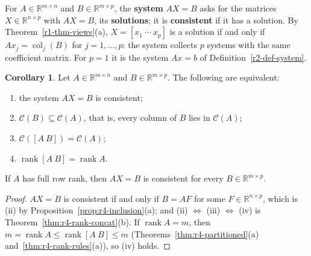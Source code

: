 \documentclass[12pt]{article}
\newcommand{\R}{\mathbb R}
\DeclareMathOperator{\col}{col}
\DeclareMathOperator{\rank}{rank}
\theoremstyle{definition}
\newtheorem{corollary}[theorem]{Corollary}
\begin{document}
For \(A\in\R^{m\times n}\) and \(B\in\R^{m\times p}\), the \textbf{system} \(AX=B\) asks for the matrices
\(X\in\R^{n\times p}\) with \(AX=B\), its \textbf{solutions}; it is \textbf{consistent} if it has a solution. By
Theorem~\ref{r1-thm-views}(a), \(X=[x_1\ \cdots\ x_p]\) is a solution if and only if \(Ax_j=\col_j(B)\) for
\(j=1,\dots,p\): the system collects \(p\) systems with the same coefficient matrix. For \(p=1\) it is the system
\(Ax=b\) of Definition~\ref{r2-def-system}.

\begin{corollary}\label{cor:r4-matrix-system}
Let \(A\in\R^{m\times n}\) and \(B\in\R^{m\times p}\). The following are equivalent:
\begin{enumerate}[label=(\roman*)]
\item the system \(AX=B\) is consistent;
\item \(\mathcal C(B)\subseteq\mathcal C(A)\), that is, every column of \(B\) lies in \(\mathcal C(A)\);
\item \(\mathcal C([A\ B])=\mathcal C(A)\);
\item \(\rank[A\ B]=\rank A\).
\end{enumerate}
If \(A\) has full row rank, then \(AX=B\) is consistent for every \(B\in\R^{m\times p}\).
\end{corollary}
\begin{proof}
\(AX=B\) is consistent if and only if \(B=AF\) for some \(F\in\R^{n\times p}\), which is (ii) by
Proposition~\ref{prop:r4-inclusion}(a); and (ii) \(\Leftrightarrow\) (iii) \(\Leftrightarrow\) (iv) is
Theorem~\ref{thm:r4-rank-concat}(b). If \(\rank A=m\), then
\(m=\rank A\leqslant\rank[A\ B]\leqslant m\) (Theorems~\ref{thm:r4-partitioned}(a) and~\ref{thm:r4-rank-rules}(a)),
so (iv) holds.
\end{proof}
\end{document}
